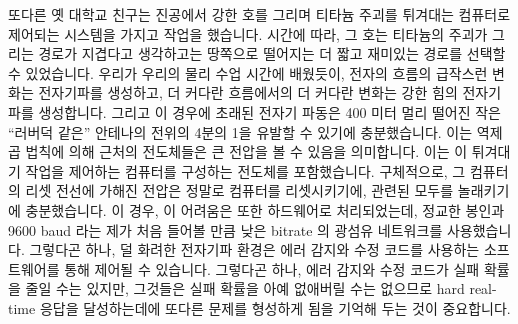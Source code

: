 또다른 옛 대학교 친구는 진공에서 강한 호를 그리며 티타늄 주괴를 튀겨대는
컴퓨터로 제어되는 시스템을 가지고 작업을 했습니다.
시간에 따라, 그 호는 티타늄의 주괴가 그리는 경로가 지겹다고 생각하고는 땅쪽으로
떨어지는 더 짧고 재미있는 경로를 선택할 수 있었습니다.
우리가 우리의 물리 수업 시간에 배웠듯이, 전자의 흐름의 급작스런 변화는
전자기파를 생성하고, 더 커다란 흐름에서의 더 커다란 변화는 강한 힘의 전자기파를
생성합니다.
그리고 이 경우에 초래된 전자기 파동은 400 미터 멀리 떨어진 작은 ``러버덕 같은''
안테나의 전위의 4분의 1을 유발할 수 있기에 충분했습니다.
이는 역제곱 법칙에 의해 근처의 전도체들은 큰 전압을 볼 수 있음을 의미합니다.
이는 이 튀겨대기 작업을 제어하는 컴퓨터를 구성하는 전도체를 포함했습니다.
구체적으로, 그 컴퓨터의 리셋 전선에 가해진 전압은 정말로 컴퓨터를 리셋시키기에,
관련된 모두를 놀래키기에 충분했습니다.
이 경우, 이 어려움은 또한 하드웨어로 처리되었는데, 정교한 봉인과 9600 baud 라는
제가 처음 들어볼 만큼 낮은 bitrate 의 광섬유 네트워크를 사용했습니다.
그렇다곤 하나, 덜 화려한 전자기파 환경은 에러 감지와 수정 코드를 사용하는
소프트웨어를 통해 제어될 수 있습니다.
그렇다곤 하나, 에러 감지와 수정 코드가 실패 확률을 줄일 수는 있지만, 그것들은
실패 확률을 아예 없애버릴 수는 없으므로 hard real-time 응답을 달성하는데에
또다른 문제를 형성하게 됨을 기억해 두는 것이 중요합니다.

